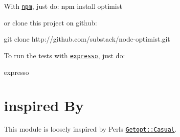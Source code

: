 With \href{http://github.com/isaacs/npm}{\tt npm}, just do\+: npm install optimist

or clone this project on github\+: \begin{DoxyVerb}git clone http://github.com/substack/node-optimist.git
\end{DoxyVerb}


To run the tests with \href{http://github.com/visionmedia/expresso}{\tt expresso}, just do\+: \begin{DoxyVerb}expresso
\end{DoxyVerb}


\section*{inspired By }

This module is loosely inspired by Perl\textquotesingle{}s \href{http://search.cpan.org/~photo/Getopt-Casual-0.13.1/Casual.pm}{\tt Getopt\+::\+Casual}. 